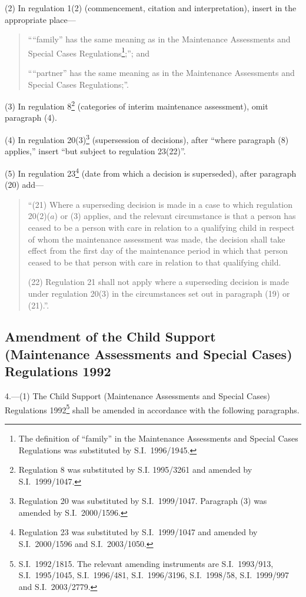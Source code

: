 \documentclass[12pt,a4paper]{article}
\begin{document}
(2) In regulation 1(2) (commencement, citation and interpretation), insert in the appropriate place—
\begin{quotation}
““family” has the same meaning as in the Maintenance Assessments and Special Cases Regulations\footnote{The definition of “family” in the Maintenance Assessments and Special Cases Regulations was substituted by S.I.\ 1996/1945.};”; and

““partner” has the same meaning as in the Maintenance Assessments and Special Cases Regulations;”.
\end{quotation}

(3) In regulation 8\footnote{Regulation 8 was substituted by S.I. 1995/3261 and amended by S.I.\ 1999/1047.} (categories of interim maintenance assessment), omit paragraph (4).

(4) In regulation 20(3)\footnote{Regulation 20 was substituted by S.I.\ 1999/1047. Paragraph (3) was amended by S.I.\ 2000/1596.} (supersession of decisions), after “where paragraph (8) applies,” insert “but subject to regulation 23(22)”.

(5) In regulation 23\footnote{Regulation 23 was substituted by S.I.\ 1999/1047 and amended by S.I.\ 2000/1596 and S.I.\ 2003/1050.} (date from which a decision is superseded), after paragraph (20) add—
\begin{quotation}
“(21) Where a superseding decision is made in a case to which regulation 20(2)($a$)  or (3) applies, and the relevant circumstance is that a person has ceased to be a person with care in relation to a qualifying child in respect of whom the maintenance assessment was made, the decision shall take effect from the first day of the maintenance period in which that person ceased to be that person with care in relation to that qualifying child.

(22) Regulation 21 shall not apply where a superseding decision is made under regulation 20(3) in the circumstances set out in paragraph (19) or (21).”.
\end{quotation}

\subsection[4. Amendment of the Child Support (Maintenance Assessments and Special Cases) Regulations 1992]{Amendment of the Child Support (Maintenance Assessments and Special Cases) Regulations 1992}

4.---(1)  The Child Support (Maintenance Assessments and Special Cases) Regulations 1992\footnote{S.I.\ 1992/1815. The relevant amending instruments are S.I.\ 1993/913, S.I.\ 1995/1045, S.I.\ 1996/481, S.I.\ 1996/3196, S.I.\ 1998/58, S.I.\ 1999/997 and S.I.\ 2003/2779.} shall be amended in accordance with the following paragraphs.
\end{document}
